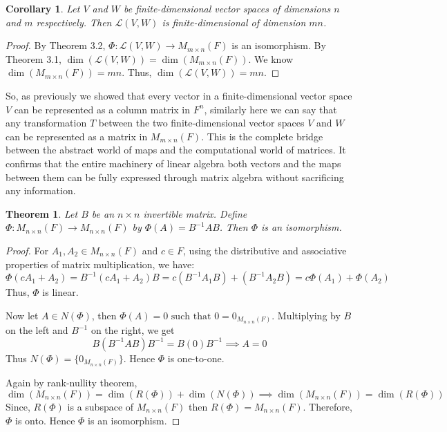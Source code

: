 \documentclass[12pt, a4paper]{article}
\newtheorem{theorem}{Theorem}[section]
\newtheorem{corollary}{Corollary}[theorem]
\theoremstyle{definition}
\theoremstyle{remark}
\newcommand{\st}{\text{ such that }}
\begin{document}
\begin{corollary}
    Let $V$ and $W$ be finite-dimensional vector spaces of dimensions $n$ and $m$ respectively. Then $\mathscr{L}(V, W)$ is finite-dimensional of dimension $mn$.
\end{corollary}

\begin{proof}
    By Theorem 3.2, $\Phi: \mathscr{L}(V, W) \to M_{m \times n}(F)$ is an isomorphism. By Theorem 3.1, $\dim(\mathscr{L}(V, W)) = \dim(M_{m \times n}(F))$. We know $\dim(M_{m \times n}(F)) = mn$. Thus, $\dim(\mathscr{L}(V, W)) = mn$.
\end{proof}

So, as previously we showed that every vector in a finite-dimensional vector space $V$ can be represented as a column matrix in $F^n$, similarly here we can say that any transformation $T$ between the two finite-dimensional vector spaces $V$ and $W$ can be represented as a matrix in $M_{m \times n}(F)$. This is the complete bridge between the abstract world of maps and the computational world of matrices. It confirms that the entire machinery of linear algebra both vectors and the maps between them can be fully expressed through matrix algebra without sacrificing any information.

\begin{theorem}
    Let $B$ be an $n \times n$ invertible matrix. Define $\Phi: M_{n \times n}(F) \to M_{n \times n}(F)$ by $\Phi(A) = B^{-1}AB$. Then $\Phi$ is an isomorphism.
\end{theorem}

\begin{proof}
    For $A_1, A_2 \in M_{n \times n}(F)$ and $c \in F$, using the distributive and associative properties of matrix multiplication, we have:
    \[ \Phi(cA_1 + A_2) = B^{-1}(cA_1 + A_2)B = c(B^{-1}A_1B) + (B^{-1}A_2B) = c\Phi(A_1) + \Phi(A_2) \]
    Thus, $\Phi$ is linear.

    Now let $A \in N(\Phi)$, then $\Phi(A) = 0 \st 0 = 0_{M_{n \times n}(F)}$. Multiplying by $B$ on the left and $B^{-1}$ on the right, we get
    \[ B(B^{-1}AB)B^{-1} = B(0)B^{-1} \implies A = 0 \]
    Thus $N(\Phi) = \{0_{M_{n \times n}(F)}\}$. Hence $\Phi$ is one-to-one.

    Again by rank-nullity theorem,
    \[\dim(M_{n \times n}(F)) = \dim(R(\Phi)) + \dim(N(\Phi)) \implies \dim(M_{n \times n}(F)) = \dim(R(\Phi))\]
    Since, $R(\Phi)$ is a subspace of $M_{n \times n}(F)$ then $R(\Phi) = M_{n \times n}(F)$. Therefore, $\Phi$ is onto. Hence $\Phi$ is an isomorphism.
\end{proof}
\end{document}
